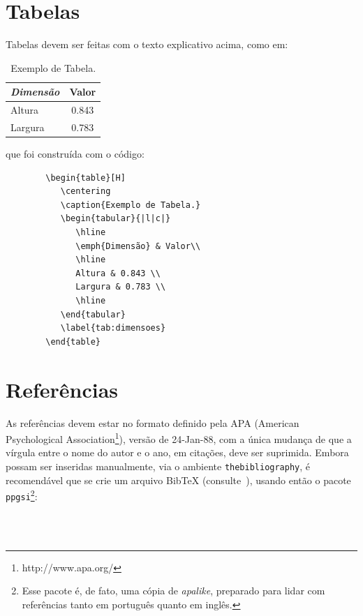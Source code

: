 \documentclass[12pt,a4paper,utf8]{ppgsi}
\newcommand{\BibTeX}{{\sc Bib}\TeX} %
\begin{document}
\section{Tabelas}

	Tabelas devem ser feitas com o texto explicativo acima, como em:

	\begin{table}[H]
		\centering
		\caption{Exemplo de Tabela.}
		\begin{tabular}{|l|c|}
			\hline
			\emph{Dimensão} & Valor\\
			\hline
			Altura & 0.843 \\
			Largura & 0.783 \\
			\hline
		\end{tabular}
		\label{tab:dimensoes}
	\end{table}

	\noindent que foi construída com o código:

	\begin{verbatim}
		\begin{table}[H]
		   \centering
		   \caption{Exemplo de Tabela.}
		   \begin{tabular}{|l|c|}
		      \hline
		      \emph{Dimensão} & Valor\\
		      \hline
		      Altura & 0.843 \\
		      Largura & 0.783 \\
		      \hline
		   \end{tabular}
		   \label{tab:dimensoes}
		\end{table}
	\end{verbatim}


\section{Referências}
\label{sec:bibtex}

	As referências devem estar no formato definido pela APA (American Psychological Association\footnote{http://www.apa.org/}), versão de 24-Jan-88, com a única mudança de que a vírgula entre o nome do autor e o ano, em citações, deve ser suprimida. Embora possam ser inseridas manualmente, via o ambiente \verb|thebibliography|, é recomendável que se crie um arquivo \BibTeX{} (consulte~\citep{Mittelbach2004}), usando então o pacote \verb|ppgsi|\footnote{Esse pacote é, de fato, uma cópia de \emph{apalike}, preparado para lidar com referências tanto em português quanto em inglês.}:

	\begin{verbatim}
		   
		   
	\end{verbatim}
\end{document}
